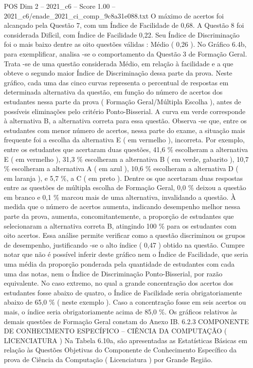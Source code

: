 \begin{textsample}{POS Dim 2 – 2021\_c6 – Score 1.00 – 2021\_c6/enade\_2021\_ci\_comp\_9c8a31e088.txt}
O máximo de acertos foi alcançado pela Questão 7, com um Índice de Facilidade de 0,68.
A Questão 8 foi considerada Difícil, com Índice de Facilidade 0,22.
Seu Índice de Discriminação foi o mais baixo dentre as oito questões válidas : Médio ( 0,26 ).
No Gráfico 6.4b, para exemplificar, analisa -se o comportamento da Questão 3 de Formação Geral.
Trata -se de uma questão considerada Médio, em relação à facilidade e a que obteve o segundo maior Índice de Discriminação dessa parte da prova.
Neste gráfico, cada uma das cinco curvas representa o percentual de respostas em determinada alternativa da questão, em função do número de acertos dos estudantes nessa parte da prova ( Formação Geral/Múltipla Escolha ), antes de possíveis eliminações pelo critério Ponto-Bisserial.
A curva em verde corresponde à alternativa B, a alternativa correta para essa questão.
Observa -se que, entre os estudantes com menor número de acertos, nessa parte do exame, a situação mais frequente foi a escolha da alternativa E ( em vermelho ), incorreta.
Por exemplo, entre os estudantes que acertaram duas questões, 41,6 \% escolheram a alternativa E ( em vermelho ), 31,3 \% escolheram a alternativa B ( em verde, gabarito ), 10,7 \% escolheram a alternativa A ( em azul ), 10,6 \% escolheram a alternativa D ( em laranja ), e 5,7 \%, a C ( em preto ).
Dentre os que acertaram duas respostas entre as questões de múltipla escolha de Formação Geral, 0,0 \% deixou a questão em branco e 0,1 \% marcou mais de uma alternativa, invalidando a questão.
À medida que o número de acertos aumenta, indicando desempenho melhor nessa parte da prova, aumenta, concomitantemente, a proporção de estudantes que selecionaram a alternativa correta B, atingindo 100 \% para os estudantes com oito acertos.
Essa análise permite verificar como a questão discriminou os grupos de desempenho, justificando -se o alto índice ( 0,47 ) obtido na questão.
Cumpre notar que não é possível inferir deste gráfico nem o Índice de Facilidade, que seria uma média da proporção ponderada pela quantidade de estudantes com cada uma das notas, nem o Índice de Discriminação Ponto-Bisserial, por razão equivalente.
No caso extremo, no qual a grande concentração dos acertos dos estudantes fosse abaixo de quatro, o Índice de Facilidade seria obrigatoriamente abaixo de 65,0 \% ( neste exemplo ).
Caso a concentração fosse em seis acertos ou mais, o índice seria obrigatoriamente acima de 85,0 \%.
Os gráficos relativos às demais questões de Formação Geral constam do Anexo IB. 6.2.3 COMPONENTE DE CONHECIMENTO ESPECÍFICO – CIÊNCIA DA COMPUTAÇÃO ( LICENCIATURA ) Na Tabela 6.10a, são apresentadas as Estatísticas Básicas em relação às Questões Objetivas do Componente de Conhecimento Específico da prova de Ciência da Computação ( Licenciatura ) por Grande Região.

\end{textsample}
